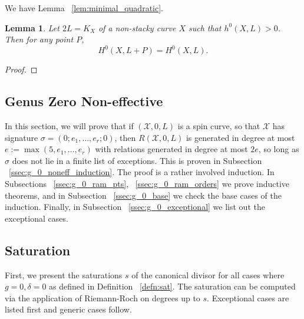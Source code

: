 \documentclass{amsart}
\theoremstyle{plain}
\newtheorem{lem}[thm]{Lemma}
\theoremstyle{definition}
\theoremstyle{remark}
\numberwithin{equation}{section}
\newcommand\ssec{\subsection}
\newcommand \sx{\mathscr X}
\newcommand \halfcan{L}
\begin{document}
We have Lemma ~\ref{lem:minimal_quadratic}.


\begin{lem}\label{lem:add_point_effective_divisor_deg_1_but_not_deg_2_generators}
Let $2\halfcan=K_X$ of a non-stacky curve $X$ such that $h^0(X, \halfcan) > 0$.  Then for any point $P$, 
\[
	H^0(X, \halfcan+P)=H^0(X,\halfcan).
\]
\end{lem}
\begin{proof}
\end{proof}

\ssec{Genus Zero Non-effective}
\label{ssec:g_0_non_effective}


In this section, we will prove that if $(\sx , 0, L)$ is a spin curve,
so that $\sx$ has signature $\sigma = (0; e_1, \ldots , e_r; 0)$, then
$R(\sx , 0, L)$ is generated in degree at most $e := \max(5, e_1, \ldots,
e_r)$ with relations generated in degree at most $2e$, so long as $\sigma$
does not lie in a finite list of exceptions. This is proven in
Subsection ~\ref{ssec:g_0_noneff_induction}. The proof is a rather
involved induction. In Subsections ~\ref{ssec:g_0_ram_pts},
~\ref{ssec:g_0_ram_orders}  we prove inductive theorems, and in
Subsection ~\ref{ssec:g_0_base} we check the base cases of the
induction. Finally, in Subsection ~\ref{ssec:g_0_exceptional} we
list out the exceptional cases.

\ssec{Saturation}
\label{ssec:g_0_saturation}
First, we present the saturations $s$ of the canonical divisor for
all cases where $g = 0, \delta = 0$ as defined in Definition
~\ref{defn:sat}. The saturation can be computed via the application
of Riemann-Roch on degrees up to $s$. Exceptional cases are listed
first and generic cases follow.
\end{document}
